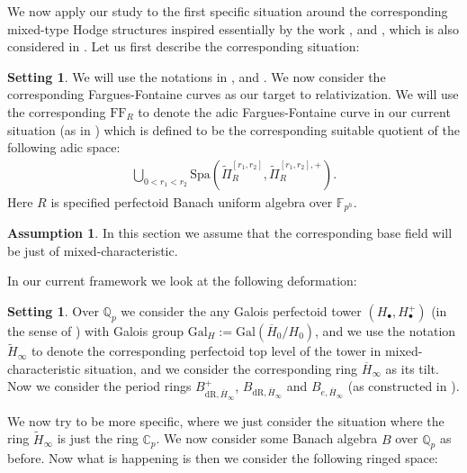 \documentclass[12pt]{amsart}
\theoremstyle{definition}
\numberwithin{equation}{section}
\newtheorem{assumption}[theorem]{Assumption}
\newtheorem{setting}[theorem]{Setting}
\begin{document}
\indent We now apply our study to the first specific situation around the corresponding mixed-type Hodge structures inspired essentially by the work \cite{CKZ}, \cite{PZ} and \cite{Ked1}, which is also considered in \cite{T3}. Let us first describe the corresponding situation:


\begin{setting}
We will use the notations in \cite{T1}, \cite{T2} and \cite{T3}. We now consider the corresponding Fargues-Fontaine curves as our target to relativization. We will use the corresponding $\mathrm{FF}_R$ to denote the adic Fargues-Fontaine curve in our current situation (as in \cite[Theorem 4.6.1]{KL2}) which is defined to be the corresponding suitable quotient of the following adic space:
\begin{align}
\bigcup_{0<r_1<r_2} \mathrm{Spa}(\widetilde{\Pi}^{[r_1,r_2]}_R,\widetilde{\Pi}^{[r_1,r_2],+}_R).	
\end{align}
Here $R$ is specified perfectoid Banach uniform algebra over $\mathbb{F}_{p^h}$.
\end{setting}


\begin{assumption}
In this section we assume that the corresponding base field will be just of mixed-characteristic.	
\end{assumption}



\indent In our current framework we look at the following deformation:

\begin{setting}
Over $\mathbb{Q}_p$ we consider the any Galois perfectoid tower $(H_\bullet,H_\bullet^+)$ (in the sense of \cite[Definition 5.1.1]{KL2}) with Galois group $\mathrm{Gal}_H:=\mathrm{Gal}(\overline{H}_0/H_0)$, and we use the notation $\widetilde{H}_\infty$ to denote the corresponding perfectoid top level of the tower in mixed-characteristic situation, and we consider the corresponding ring $\overline{H}_\infty$ as its tilt. Now we consider the period rings $B_{\mathrm{dR},\overline{H}_\infty}^+$, $B_{\mathrm{dR},\overline{H}_\infty}$ and $B_{e,\overline{H}_\infty}$ (as constructed in \cite[Definition 8.6.5]{KL2}). 	
\end{setting}



\indent We now try to be more specific, where we just consider the situation where the ring $\widetilde{H}_\infty$ is just the ring $\mathbb{C}_p$. We now consider some Banach algebra $B$ over $\mathbb{Q}_p$ as before. Now what is happening is then we consider the following ringed space:
\end{document}
